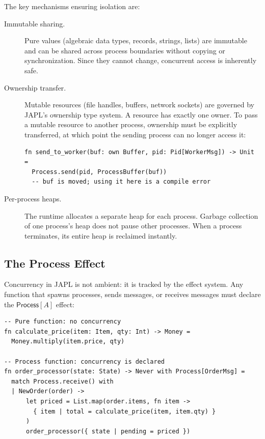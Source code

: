 \documentclass[11pt,a4paper]{article}
\begin{document}
The key mechanisms ensuring isolation are:

\begin{description}
\item[Immutable sharing.] Pure values (algebraic data types, records, strings, lists) are immutable and can be shared across process boundaries without copying or synchronization. Since they cannot change, concurrent access is inherently safe.

\item[Ownership transfer.] Mutable resources (file handles, buffers, network sockets) are governed by JAPL's ownership type system. A resource has exactly one owner. To pass a mutable resource to another process, ownership must be explicitly transferred, at which point the sending process can no longer access it:
\begin{lstlisting}[language=japl,caption={Ownership transfer between processes}]
fn send_to_worker(buf: own Buffer, pid: Pid[WorkerMsg]) -> Unit =
  Process.send(pid, ProcessBuffer(buf))
  -- buf is moved; using it here is a compile error
\end{lstlisting}

\item[Per-process heaps.] The runtime allocates a separate heap for each process. Garbage collection of one process's heap does not pause other processes. When a process terminates, its entire heap is reclaimed instantly.
\end{description}

\subsection{The Process Effect}

Concurrency in JAPL is not ambient: it is tracked by the effect system. Any function that spawns processes, sends messages, or receives messages must declare the $\mathsf{Process}[A]$ effect:

\begin{lstlisting}[language=japl,caption={The Process effect in function signatures}]
-- Pure function: no concurrency
fn calculate_price(item: Item, qty: Int) -> Money =
  Money.multiply(item.price, qty)

-- Process function: concurrency is declared
fn order_processor(state: State) -> Never with Process[OrderMsg] =
  match Process.receive() with
  | NewOrder(order) ->
      let priced = List.map(order.items, fn item ->
        { item | total = calculate_price(item, item.qty) }
      )
      order_processor({ state | pending = priced })
\end{lstlisting}
\end{document}
